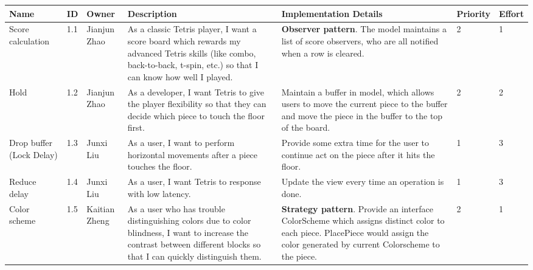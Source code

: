 \documentclass{article}
\begin{document}
\begin{xltabular}{\textwidth}{|p{2cm}|p{0.5cm}|p{1.5cm}|p{3cm}|p{3.5cm}|p{1.75cm}|p{1.25cm}|}
\hline
\textbf{Name}&\textbf{ID} &\textbf{Owner}&\textbf{Description}&\textbf{Implementation Details}&\textbf{Priority}&\textbf{Effort} \\
\hline
Score calculation
& 1.1
& Jianjun Zhao
& As a classic Tetris player, I want a score board which rewards my advanced Tetris skills (like combo, back-to-back, t-spin, etc.) so that I can know how well I played. 
& \textbf{Observer pattern}. The model maintains a list of score observers, who are all notified when a row is cleared. 
& 2 & 1\\
\hline
Hold
& 1.2
& Jianjun Zhao
& As a developer, I want Tetris to give the player flexibility so that they can decide which piece to touch the floor first. 
& Maintain a buffer in model, which allows users to move the current piece to the buffer and move the piece in the buffer to the top of the board. 
& 2 & 2 \\
\hline
Drop buffer (Lock Delay) 
& 1.3
& Junxi Liu
& As a user, I want to perform horizontal movements after a piece touches the floor. 
& Provide some extra time for the user to continue act on the piece after it hits the floor.
& 1 & 3 \\

\hline
Reduce delay 
& 1.4
& Junxi Liu
& As a user, I want Tetris to response with low latency.  
& Update the view every time an operation is done.
& 1 & 3 \\

\hline
Color scheme 
& 1.5
& Kaitian Zheng
& As a user who has trouble distinguishing colors due to color blindness, I want to increase the contrast between different blocks so that I can quickly distinguish them. 
& \textbf{Strategy pattern}. Provide an interface ColorScheme which assigns distinct color to each piece. PlacePiece would assign the color generated by current Colorscheme to the piece. 
& 2 & 1 \\


\end{xltabular}
\end{document}
